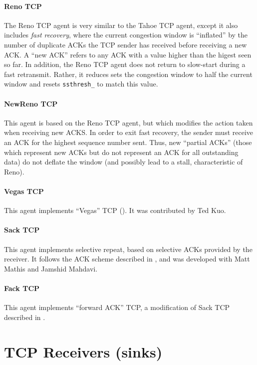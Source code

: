 \paragraph{Reno TCP}
The Reno TCP agent is very similar to the Tahoe TCP agent,
except it also includes {\em fast recovery}, where the current
congestion window is ``inflated'' by the number of duplicate ACKs
the TCP sender has received before receiving a new ACK.
A ``new ACK'' refers to any ACK with a value higher than the higest
seen so far.
In addition, the Reno TCP agent does not return to slow-start during
a fast retransmit.
Rather, it reduces sets the congestion window to half the current
window and resets {\tt ssthresh\_} to match this value.

\paragraph{NewReno TCP}
This agent is based on the Reno TCP agent, but which modifies the
action taken when receiving new ACKS.
In order to exit fast recovery, the sender must receive an ACK for the
highest sequence number sent.
Thus, new ``partial ACKs'' (those which represent new ACKs but do not
represent an ACK for all outstanding data) do not deflate the window
(and possibly lead to a stall, characteristic of Reno).

\paragraph{Vegas TCP}
This agent implements ``Vegas'' TCP (\cite{Brak94:TCP,Brak94a:TCP}).
It was contributed by Ted Kuo.

\paragraph{Sack TCP}
This agent implements selective repeat, based on selective ACKs provided
by the receiver.
It follows the ACK scheme described in \cite{rfc2018}, and was developed
with Matt Mathis and Jamshid Mahdavi.

\paragraph{Fack TCP}
This agent implements ``forward ACK'' TCP, a modification of Sack
TCP described in \cite{Math96:Forward}.

\section{TCP Receivers (sinks)}

